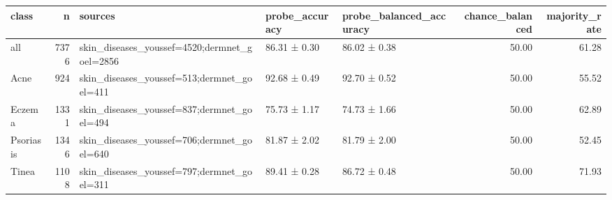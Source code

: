 \begin{tabular}{lrlllrr}
\toprule
class & n & sources & probe\_accuracy & probe\_balanced\_accuracy & chance\_balanced & majority\_rate \\
\midrule
all & 7376 & skin\_diseases\_youssef=4520;dermnet\_goel=2856 & 86.31 ± 0.30 & 86.02 ± 0.38 & 50.00 & 61.28 \\
Acne & 924 & skin\_diseases\_youssef=513;dermnet\_goel=411 & 92.68 ± 0.49 & 92.70 ± 0.52 & 50.00 & 55.52 \\
Eczema & 1331 & skin\_diseases\_youssef=837;dermnet\_goel=494 & 75.73 ± 1.17 & 74.73 ± 1.66 & 50.00 & 62.89 \\
Psoriasis & 1346 & skin\_diseases\_youssef=706;dermnet\_goel=640 & 81.87 ± 2.02 & 81.79 ± 2.00 & 50.00 & 52.45 \\
Tinea & 1108 & skin\_diseases\_youssef=797;dermnet\_goel=311 & 89.41 ± 0.28 & 86.72 ± 0.48 & 50.00 & 71.93 \\
\bottomrule
\end{tabular}
